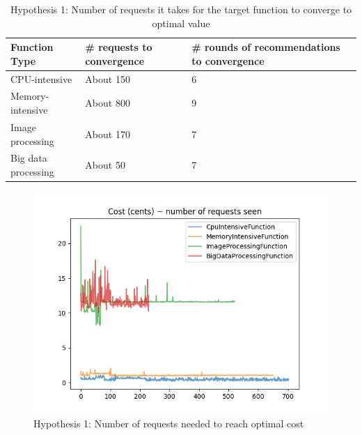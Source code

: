 \documentclass[conference]{IEEEtran}
\begin{document}
\begin{table}
\centering

\begin{tabular}{|p{1in}|p{1in}|p{1in}|}
\hline
Function Type & \# requests to convergence& \# rounds of recommendations to convergence\\
\hline

\hline
CPU-intensive & About 150 & 6\\
\hline
Memory-intensive & About 800 & 9\\
\hline
Image processing & About 170 & 7 \\
\hline
Big data processing & About 50 & 7\\
\hline

\end{tabular}
\caption{Hypothesis 1: Number of requests it takes for the target function to converge to optimal value}
\label{table: 2}
\end{table}

\begin{figure}
    \includegraphics[width=1\linewidth]{images/H1_ExecutionTimeVsNumberOfRequests_Budget.PNG}
    \caption{Hypothesis 1: Number of requests needed to reach optimal cost}
    \label{fig: h1_results_budget}
\end{figure}



\end{document}
